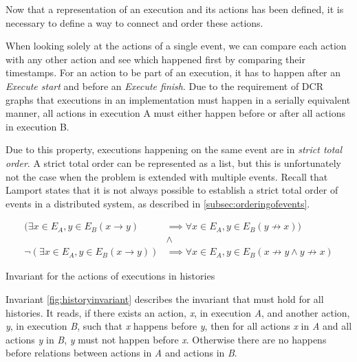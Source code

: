 	\newpar Now that a representation of an execution and its actions has been defined, it is necessary to define a way to connect and order these actions.
    
    \newpar When looking solely at the actions of a single event, we can compare each action with any other action and see which happened first by comparing their timestamps. For an action to be part of an execution, it has to happen after an \textit{Execute start} and before an \textit{Execute finish}. Due to the requirement of DCR graphs that executions in an implementation must happen in a serially equivalent manner, all actions in execution A must either happen before or after all actions in execution B.
    
	\newpar Due to this property, executions happening on the same event are in  \textit{strict total order}. A strict total order can be represented as a list, but this is unfortunately not the case when the problem is extended with multiple events. Recall that Lamport states that it is not always possible to establish a strict total order of events in a distributed system, as described in \autoref{subsec:orderingofevents}.
	
	\begin{invariant}
		\begin{align*}
			(\exists{x\in E_A, y\in E_B}(x\rightarrow y) &\implies \forall{x\in E_A, y\in E_B}(y\not\rightarrow x))\\
			&\land \\
			\lnot(\exists{x\in E_A, y\in E_B}(x \rightarrow y)) &\implies \forall{x\in E_A, y\in E_B}(x\not\rightarrow y\land y\not\rightarrow x)
		\end{align*}
		\caption{Invariant for the actions of executions in histories}
		\label{fig:historyinvariant}
	\end{invariant}
	
	\newpar
	Invariant \ref{fig:historyinvariant} describes the invariant that must hold for all histories. It reads, if there exists an action, \textit{x}, in execution \textit{A}, and another action, \textit{y}, in execution \textit{B}, such that \textit{x} happens before \textit{y}, then for all actions \textit{x} in \textit{A} and all actions \textit{y} in \textit{B}, \textit{y} must not happen before \textit{x}. Otherwise there are no happens before relations between actions in \textit{A} and actions in \textit{B}.
	

